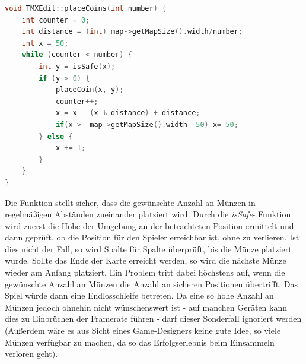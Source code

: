 \begin{lstlisting}[label=lst:place_coins,
				   language=C++,
				   firstnumber=171,
				   caption=Automatisches Platzieren von Münzen( TMXEdit.cpp )]
void TMXEdit::placeCoins(int number) {
	int counter = 0;
	int distance = (int) map->getMapSize().width/number;
	int x = 50;
	while (counter < number) {
		int y = isSafe(x);
		if (y > 0) {
			placeCoin(x, y);
			counter++;
			x = x - (x % distance) + distance;
			if(x >  map->getMapSize().width -50) x= 50;
		} else {
			x += 1;
		}
	}
}
\end{lstlisting}
Die Funktion stellt sicher, dass die gewünschte Anzahl an Münzen in regelmäßigen Abständen zueinander platziert wird. Durch die \textit{isSafe}- Funktion wird zuerst die Höhe der Umgebung an der betrachteten Position ermittelt und dann geprüft, ob die Position für den Spieler erreichbar ist, ohne zu verlieren. Ist dies nicht der Fall, so wird Spalte für Spalte überprüft, bis die Münze platziert wurde. Sollte das Ende der Karte erreicht werden, so wird die nächste Münze wieder am Anfang platziert. Ein Problem tritt dabei höchstens auf, wenn die gewünschte Anzahl an Münzen die Anzahl an sicheren Positionen übertrifft. Das Spiel würde dann eine Endlosschleife betreten. Da eine so hohe Anzahl an Münzen jedoch ohnehin nicht wünschenswert ist - auf manchen Geräten kann dies zu Einbrüchen der Framerate führen - darf dieser Sonderfall ignoriert werden (Außerdem wäre es aus Sicht eines Game-Designers keine gute Idee, so viele Münzen verfügbar zu machen, da so das Erfolgserlebnis beim Einsammeln verloren geht).

